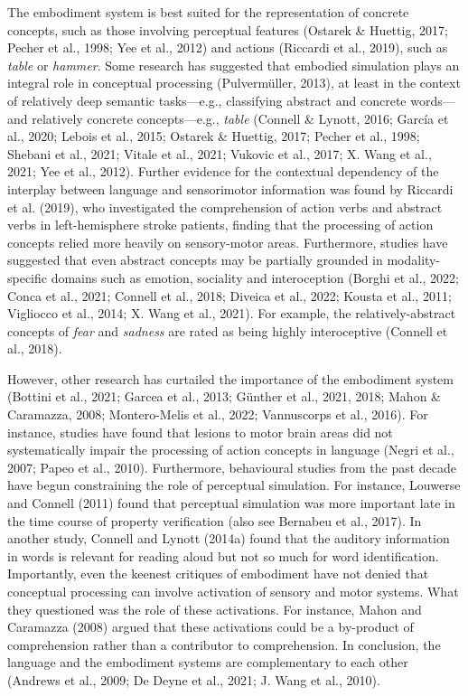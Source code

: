 \documentclass[
  12pt,
  man,floatsintext]{apa7}
\begin{document}
The embodiment system is best suited for the representation of concrete concepts, such as those involving perceptual features (Ostarek \& Huettig, 2017; Pecher et al., 1998; Yee et al., 2012) and actions (Riccardi et al., 2019), such as \emph{table} or \emph{hammer}. Some research has suggested that embodied simulation plays an integral role in conceptual processing (Pulvermüller, 2013), at least in the context of relatively deep semantic tasks---e.g., classifying abstract and concrete words---and relatively concrete concepts---e.g., \emph{table} (Connell \& Lynott, 2016; García et al., 2020; Lebois et al., 2015; Ostarek \& Huettig, 2017; Pecher et al., 1998; Shebani et al., 2021; Vitale et al., 2021; Vukovic et al., 2017; X. Wang et al., 2021; Yee et al., 2012). Further evidence for the contextual dependency of the interplay between language and sensorimotor information was found by Riccardi et al. (2019), who investigated the comprehension of action verbs and abstract verbs in left-hemisphere stroke patients, finding that the processing of action concepts relied more heavily on sensory-motor areas. Furthermore, studies have suggested that even abstract concepts may be partially grounded in modality-specific domains such as emotion, sociality and interoception (Borghi et al., 2022; Conca et al., 2021; Connell et al., 2018; Diveica et al., 2022; Kousta et al., 2011; Vigliocco et al., 2014; X. Wang et al., 2021). For example, the relatively-abstract concepts of \emph{fear} and \emph{sadness} are rated as being highly interoceptive (Connell et al., 2018).

However, other research has curtailed the importance of the embodiment system (Bottini et al., 2021; Garcea et al., 2013; Günther et al., 2021, 2018; Mahon \& Caramazza, 2008; Montero-Melis et al., 2022; Vannuscorps et al., 2016). For instance, studies have found that lesions to motor brain areas did not systematically impair the processing of action concepts in language (Negri et al., 2007; Papeo et al., 2010). Furthermore, behavioural studies from the past decade have begun constraining the role of perceptual simulation. For instance, Louwerse and Connell (2011) found that perceptual simulation was more important late in the time course of property verification (also see Bernabeu et al., 2017). In another study, Connell and Lynott (2014a) found that the auditory information in words is relevant for reading aloud but not so much for word identification. Importantly, even the keenest critiques of embodiment have not denied that conceptual processing can involve activation of sensory and motor systems. What they questioned was the role of these activations. For instance, Mahon and Caramazza (2008) argued that these activations could be a by-product of comprehension rather than a contributor to comprehension. In conclusion, the language and the embodiment systems are complementary to each other (Andrews et al., 2009; De Deyne et al., 2021; J. Wang et al., 2010).
\end{document}
